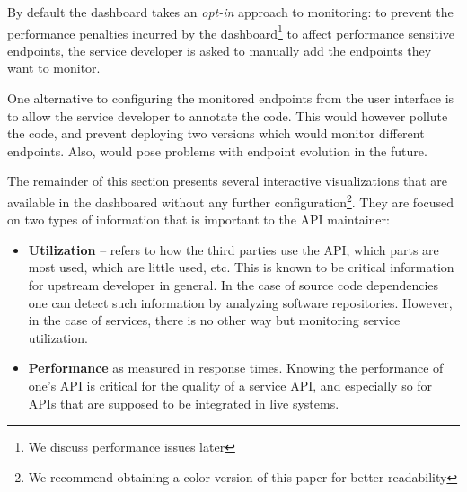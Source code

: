  By default the dashboard takes an {\em opt-in} approach to monitoring: to prevent the performance penalties incurred by the dashboard\footnote{We discuss performance issues later} to affect performance sensitive endpoints, the service developer is asked to manually add the endpoints they want to monitor. 
   

  One alternative to configuring the monitored endpoints from the user interface is to allow the service developer to annotate the code. This would however pollute the code, and prevent deploying two versions which would monitor different endpoints. Also, would pose problems with endpoint evolution in the future.

  
\niceseparator

  The remainder of this section presents several interactive
  visualizations that are available in the dashboared without any further configuration\footnote{We recommend obtaining a color version of this paper for better readability}. They are focused on two types of information that is important to the API maintainer: 

  \begin{itemize}

    \item {\bf Utilization} -- refers to how the third parties use the API, which parts are most used, which are little used, etc. This is known to be critical information for upstream developer in general\cite{Haen14a}. In the case of source code dependencies one can detect such information by analyzing software repositories. However, in the case of services, there is no other way but monitoring service utilization. 

    \item {\bf Performance} as measured in response times. Knowing the performance of one’s API is critical for the quality of a service API, and especially so for APIs that are supposed to be integrated in live systems. 



  \end{itemize}
